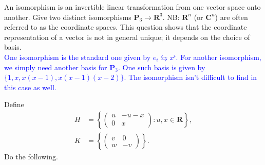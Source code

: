 \documentclass[a4paper,11pt]{article}
\newcommand{\R}{\mathbf{R}}
\newcommand{\C}{\mathbf{C}}
\newcommand{\PP}{\mathbf{P}}
\newcommand{\BB}[1]{\textcolor{blue}{#1}}
\begin{document}
 An isomorphism is an invertible linear
transformation from one vector space onto another. Give two distinct
isomorphisms $\PP_3 \rightarrow \R^3$. NB: $\R^n$ (or $\C^n$) are often referred
to as the coordinate spaces. This question shows that the coordinate
representation of a vector is not in general unique; it depends on the choice of
basis. \\

\BB{One isomorphism is the standard one given by $e_i \leftrightarrows x^i$. For
another isomorphism, we simply need another basis for $\PP_3$. One such basis is
given by $\{1, x, x(x-1), x(x-1)(x-2)\}$. The isomorphism isn't difficult to
find in this case as well. \\}

 Define
\begin{align*}
  H &=
      \left\{
      \begin{pmatrix}
        u & -u-x \\ 0 & x
      \end{pmatrix}
                        : u,x \in \R
                        \right\}, \\
  K &=
      \left\{
      \begin{pmatrix}
        v & 0 \\ w & -v
      \end{pmatrix}
                     \right\}.
\end{align*}
Do the following.
\end{document}
